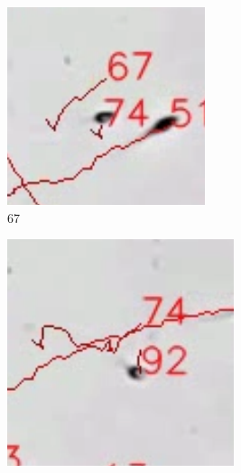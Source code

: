 \begin{figure}[h]
     \centering
     \begin{subfigure}[b]{0.3\textwidth}
         \centering
         \includegraphics[width=\textwidth]{Images/sam3333333.png}
         \caption{67 }
     \end{subfigure}
     \hfill
     \begin{subfigure}[b]{0.3\textwidth}
         \centering
         \includegraphics[width=\textwidth]{Images/sam33333333.png}

\end{subfigure}
\end{figure}
